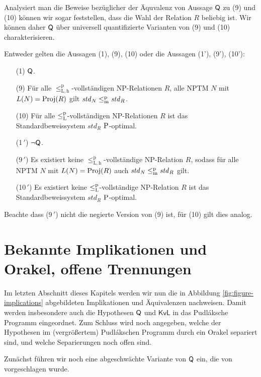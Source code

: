 Analysiert man die Beweise bezüglicher der Äquvalenz von Aussage $\hQ$ zu (9) und (10) können wir sogar feststellen, dass die Wahl der Relation $R$ beliebig ist. 
Wir können daher $\hQ$ über universell quantifizierte Varianten von (9) und (10) charakterisieren. 
\begin{theorem}
    Entweder gelten die Aussagen (1), (9), (10) oder die Aussagen (1'), (9'),  (10'):
    \begin{enumerate}
        \item[(1)] $\hQ$.
        \item[(9)] Für alle $\leq_\mathrm{L,h}^\mathrm p$-vollständigen NP-Relationen $R$, alle NPTM $N$ mit $L(N)=\Proj(R)$ gilt $\mathit{std}_N\leqmp\mathit{std}_R$.
        \item[(10)] Für alle $\leqlp$-vollständigen NP-Relationen $R$ ist das Standardbeweissystem $\mathit{std}_R$ $\P$-optimal.
        \item[(1$\,'$)] $\neg\hQ$.
        \item[(9$\,'$)] Es existiert keine $\leq_\mathrm{L,h}^\mathrm p$-vollständige NP-Relation $R$, sodass für alle NPTM $N$ mit $L(N)=\Proj(R)$ auch $\mathit{std}_N\leqmp \mathit{std}_R$ gilt.
        \item[(10$\,'$)] Es existiert keine $\leqlp$-vollständige NP-Relation $R$ ist das Standardbeweissystem $\mathit{std}_R$ $\P$-optimal.
    \end{enumerate}
    Beachte dass (9$\,'$) nicht die negierte Version von (9) ist, für (10) gilt dies analog.
\end{theorem}



\section{Bekannte Implikationen und Orakel, offene Trennungen}\label{sec:pudlak-overview}

Im letzten Abschnitt dieses Kapitels werden wir nun die in Abbildung \ref{fig:figure-implications} abgebildeten Implikationen und Äquivalenzen nachweisen.
Damit werden insbesondere auch die Hypothesen $\hQ$ und $\mathsf{KvL}$ in das Pudláksche Programm eingeordnet.
Zum Schluss wird noch angegeben, welche der Hypothesen im (vergrößertem) Pudlákschen Programm durch ein Orakel separiert sind, und welche Separierungen noch offen sind.

Zunächst führen wir noch eine abgeschwächte Variante von $\hQ$ ein, die von \textcite{fenner_inverting_2003} vorgeschlagen wurde.

